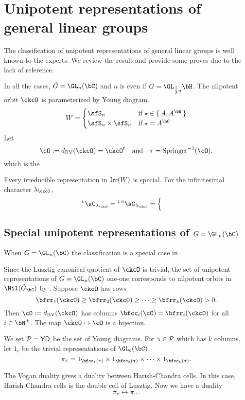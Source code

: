 \documentclass[counting_main.tex]{subfiles}
\begin{document}
\section{Unipotent representations of general linear groups}

The classification of unipotent representations of general linear groups is well
known to the experts. We review the result and provide some proves due to the
lack of reference.

%
In all the cases, $\ckG = \GL_{n}(\bC)$ and $n$ is even if
$G = \GL_{\half n}{\bH}$.
The nilpotent orbit $\ckcO$ is parameterized by Young diagram.
\[
  W = \begin{cases}
    \sfS_{n} & \text{if } \star \in \set{A, A^{\bH}}\\
    \sfS_{n}\times \sfS_{n} & \text{if } \star = A^{\bC}\\
  \end{cases}
\]
Let
\[
  \cO :=\dBV(\ckcO) = \ckcO^{t} \AND \tau = \Spr^{-1}(\cO).
\]
 which is the

Every irreducible representation in $\mathrm{Irr}(W)$ is special.
For the infinitesimal character $\lamck$,
\[
  \LC_{\lamck} = \LRC_{\lamck}= \begin{cases}
    \
  \end{cases}
\]

\subsection{Special unipotent representations of $G = \GL_n(\bC)$}
When $G = \GL_{n}(\bC)$ the classification is a special case in \cite{BVUni}.

Since the Lusztig canonical quotient of $\ckcO$ is trivial, the set of unipotent representations
of $G = \GL_n(\bC)$ one-one corresponds to nilpotent orbits in $\Nil(\ckGc)$ by
\cite{BVUni}.
Suppose $\ckcO$ has rows
\[
\bfrr_1(\ckcO)\geq \bfrr_2(\ckcO)\geq \cdots\geq
\bfrr_k(\ckcO) >0.
\]
Then $\cO := \dBV(\ckcO)$ has columns $\bfcc_i(\cO) = \bfrr_i(\ckcO)$ for all
$i\in \bN^+$.
The map $\ckcO \mapsto \cO$ is a bijection.


We set $\mathcal{P} =  \mathsf{YD}$ be the set of Young diagrams.
For $\uptau \in \mathcal{P}$ which has $k$ columns,
let $1_{c}$ be the trivial representations of $\GL_c(\bC)$.
\[
 \pi_\uptau = 1_{\bfcc_1(\uptau)}\times  1_{\bfcc_2(\uptau)}\times \cdots
 \times 1_{\bfcc_k(\uptau)}.
\]

The Vogan duality gives a duality between Harish-Chandra cells.
In this case, Harish-Chandra cells is the double cell
of Lusztig.
Now we have a duality
\[
 \pi_\uptau \leftrightarrow \pi_{\uptau^t}.
\]
\end{document}
